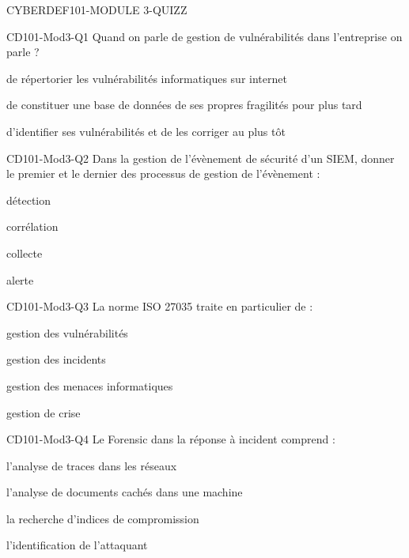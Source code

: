 \documentclass[12pt]{article}
\begin{document}
 \begin{quiz}{CYBERDEF101-MODULE 3-QUIZZ}


\begin{multi}[multiple=true]{CD101-Mod3-Q1} 
Quand on parle de gestion de vuln\'erabilit\'es dans l'entreprise on parle ?
\item de r\'epertorier les vuln\'erabilit\'es informatiques sur internet
\item* de constituer une base de donn\'ees de ses propres fragilit\'es pour plus tard
\item* d'identifier ses vuln\'erabilit\'es et de les corriger au plus t\^ot	
\end{multi}


\begin{multi}[multiple=true]{CD101-Mod3-Q2}
Dans la gestion de l'\'ev\`enement de s\'ecurit\'e d'un SIEM, donner le premier et le dernier des processus de gestion de l'\'ev\`enement :
\item* d\'etection 
\item corr\'elation
\item collecte
\item* alerte
\end{multi}

\begin{multi}[multiple=true]{CD101-Mod3-Q3}
La norme ISO 27035 traite en particulier de :
\item gestion des vuln\'erabilit\'es	
\item* gestion des incidents	
\item gestion des menaces informatiques
\item gestion de crise
\end{multi}	

\begin{multi}[multiple=true]{CD101-Mod3-Q4} 
Le Forensic dans la r\'eponse \`a incident comprend  :
\item* l'analyse de traces dans les r\'eseaux	
\item* l'analyse de documents cach\'es dans une machine
\item* la recherche d'indices de compromission
\item* l'identification de l'attaquant
\end{multi}


\end{quiz}
\end{document}
